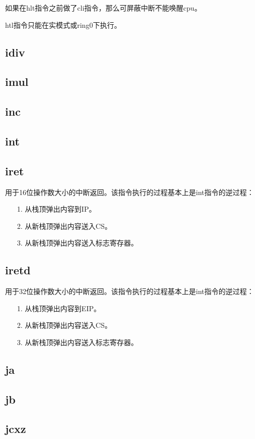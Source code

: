 \documentclass[a4paper,left=2.5cm,right=2.5cm,11pt]{article}
\begin{document}
	如果在hlt指令之前做了cli指令，那么可屏蔽中断不能唤醒cpu。\par

	htl指令只能在实模式或ring0下执行。

\subsection{idiv}
\subsection{imul}
\subsection{inc}
\subsection{int}
\subsection{iret}
	用于16位操作数大小的中断返回。该指令执行的过程基本上是int指令的逆过程：
	\begin{itemize}
		\item[1.] 从栈顶弹出内容到IP。
		\item[2.] 从新栈顶弹出内容送入CS。
		\item[3.] 从新栈顶弹出内容送入标志寄存器。
	\end{itemize}

\subsection{iretd}
	用于32位操作数大小的中断返回。该指令执行的过程基本上是int指令的逆过程：
	\begin{itemize}
		\item[1.] 从栈顶弹出内容到EIP。
		\item[2.] 从新栈顶弹出内容送入CS。
		\item[3.] 从新栈顶弹出内容送入标志寄存器。
	\end{itemize}

\subsection{ja}
\subsection{jb}
\subsection{jcxz}
\end{document}
